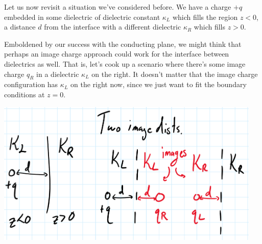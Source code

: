 \begin{exm}
    Let us now revisit a situation we've considered before. We have a charge $+q$ embedded in some dielectric of dielectric constant $\kappa_L$ which fills the region $z<0$, a distance $d$ from the interface with a different dielectric $\kappa_R$ which fills $z>0$.
    
    Emboldened by our success with the conducting plane, we might think that perhaps an image charge approach could work for the interface between dielectrics as well. That is, let's cook up a scenario where there's some image charge $q_R$ in a dielectric $\kappa_L$ on the right. It doesn't matter that the image charge configuration has $\kappa_L$ on the right now, since we just want to fit the boundary conditions at $z=0$.
    
    \includegraphics[width=0.95\textwidth]{2020/02/20200204_dielectric_images}
    

\end{exm}
